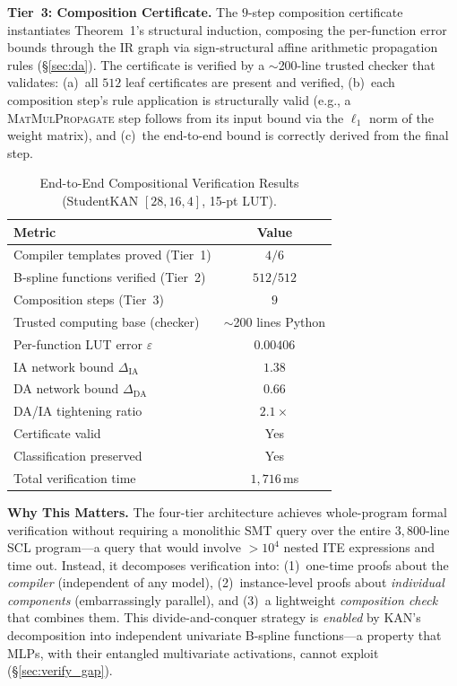 \documentclass[journal,onecolumn]{IEEEtran}
\begin{document}
\vspace{4pt}
\noindent\textbf{Tier~3: Composition Certificate.}
The $9$-step composition certificate instantiates Theorem~1's structural
induction, composing the per-function error bounds through the IR graph
via sign-structural affine arithmetic propagation rules ({\S}\ref{sec:da}). The certificate
is verified by a $\sim$200-line trusted checker that validates:
(a)~all $512$ leaf certificates are present and verified,
(b)~each composition step's rule application is structurally valid
(e.g., a \textsc{MatMulPropagate} step follows from its input bound
via the $\ell_1$ norm of the weight matrix), and
(c)~the end-to-end bound is correctly derived from the final step.

\begin{table}[ht]
\centering
\caption{End-to-End Compositional Verification Results
         (StudentKAN $[28,16,4]$, 15-pt LUT).}
\label{tab:compositional}
\begin{tabular}{@{}lc@{}}
\toprule
\textbf{Metric} & \textbf{Value} \\
\midrule
 Compiler templates proved (Tier~1)          & $4/6$ \\
 B-spline functions verified (Tier~2)        & $512/512$ \\
 Composition steps (Tier~3)                  & $9$ \\
 Trusted computing base (checker)            & $\sim$200 lines Python \\
\midrule
 Per-function LUT error $\varepsilon$        & $0.00406$ \\
 IA network bound $\Delta_{\text{IA}}$       & $1.38$ \\
 DA network bound $\Delta_{\text{DA}}$       & $0.66$ \\
 DA/IA tightening ratio                      & $2.1\times$ \\
\midrule
 Certificate valid                           & Yes \\
 Classification preserved                    & Yes \\
 Total verification time                     & $1{,}716$\,ms \\
\bottomrule
\end{tabular}
\end{table}

\vspace{4pt}
\noindent\textbf{Why This Matters.}
The four-tier architecture achieves whole-program formal verification
without requiring a monolithic SMT query over the entire $3{,}800$-line
SCL program---a query that would involve $>10^4$ nested ITE expressions
and time out. Instead, it decomposes verification into:
(1)~one-time proofs about the \textit{compiler} (independent of any
model), (2)~instance-level proofs about \textit{individual components}
(embarrassingly parallel), and (3)~a lightweight \textit{composition
check} that combines them. This divide-and-conquer strategy is
\textit{enabled} by KAN's decomposition into independent univariate
B-spline functions---a property that MLPs, with their entangled
multivariate activations, cannot exploit ({\S}\ref{sec:verify_gap}).
\end{document}
